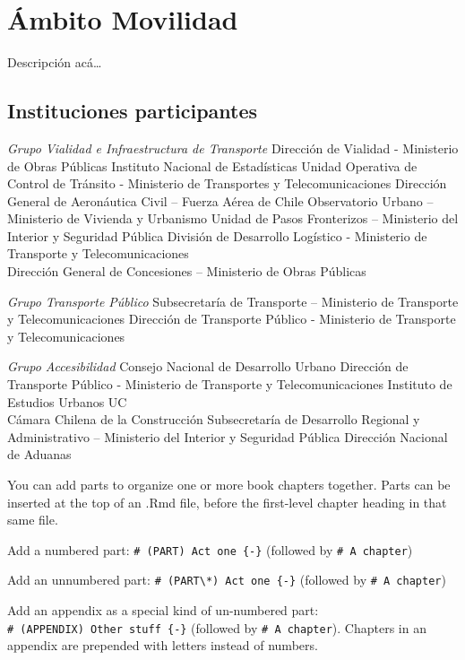 \documentclass[
]{book}
\theoremstyle{definition}
\theoremstyle{definition}
\theoremstyle{definition}
\theoremstyle{definition}
\theoremstyle{remark}
\begin{document}
\hypertarget{uxe1mbito-movilidad}{%
\chapter{Ámbito Movilidad}\label{uxe1mbito-movilidad}}

Descripción acá\ldots{}

\hypertarget{instituciones-participantes-2}{%
\section*{Instituciones participantes}\label{instituciones-participantes-2}}

\emph{Grupo Vialidad e Infraestructura de Transporte}
Dirección de Vialidad - Ministerio de Obras Públicas
Instituto Nacional de Estadísticas
Unidad Operativa de Control de Tránsito - Ministerio de Transportes y Telecomunicaciones
Dirección General de Aeronáutica Civil -- Fuerza Aérea de Chile
Observatorio Urbano -- Ministerio de Vivienda y Urbanismo
Unidad de Pasos Fronterizos -- Ministerio del Interior y Seguridad Pública
División de Desarrollo Logístico - Ministerio de Transporte y Telecomunicaciones\\
Dirección General de Concesiones -- Ministerio de Obras Públicas

\emph{Grupo Transporte Público}
Subsecretaría de Transporte -- Ministerio de Transporte y Telecomunicaciones
Dirección de Transporte Público - Ministerio de Transporte y Telecomunicaciones

\emph{Grupo Accesibilidad}
Consejo Nacional de Desarrollo Urbano
Dirección de Transporte Público - Ministerio de Transporte y Telecomunicaciones
Instituto de Estudios Urbanos UC\\
Cámara Chilena de la Construcción
Subsecretaría de Desarrollo Regional y Administrativo -- Ministerio del Interior y Seguridad Pública
Dirección Nacional de Aduanas

You can add parts to organize one or more book chapters together. Parts can be inserted at the top of an .Rmd file, before the first-level chapter heading in that same file.

Add a numbered part: \texttt{\#\ (PART)\ Act\ one\ \{-\}} (followed by \texttt{\#\ A\ chapter})

Add an unnumbered part: \texttt{\#\ (PART\textbackslash{}*)\ Act\ one\ \{-\}} (followed by \texttt{\#\ A\ chapter})

Add an appendix as a special kind of un-numbered part: \texttt{\#\ (APPENDIX)\ Other\ stuff\ \{-\}} (followed by \texttt{\#\ A\ chapter}). Chapters in an appendix are prepended with letters instead of numbers.
\end{document}

